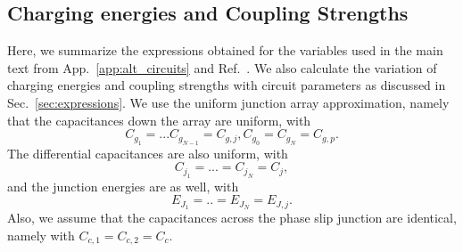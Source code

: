 \documentclass[%
reprint,
superscriptaddress,
 amsmath,amssymb,
 aps,
 prx,
longbibliography,
floatfix,
]{revtex4-2}
\begin{document}
\subsection{Charging energies and Coupling Strengths}\label{app:coupling}
Here, we summarize the expressions obtained for the variables used in the main text from App.~\ref{app:alt_circuits} and Ref.~\cite{viola2015collective}. We also calculate the variation of charging energies and coupling strengths with circuit parameters as discussed in Sec.~\ref{sec:expressions}. We use the uniform junction array approximation, namely that the capacitances down the array are uniform, with
\begin{equation}
C_{g_1}=...C_{g_{N-1}}=C_{g,j}, C_{g_0}=C_{g_N}=C_{g,p}.
\end{equation}
The differential capacitances are also uniform, with 
\begin{equation}
    C_{j_1}=...=C_{j_N}=C_{j},
\end{equation}
and the junction energies are as well, with
\begin{equation}
E_{J_1}=..=E_{J_N}=E_{J,j}.
\end{equation} Also, we assume that the capacitances across the phase slip junction are identical, namely with $C_{c,1}=C_{c,2}=C_{c}$. 
\end{document}
